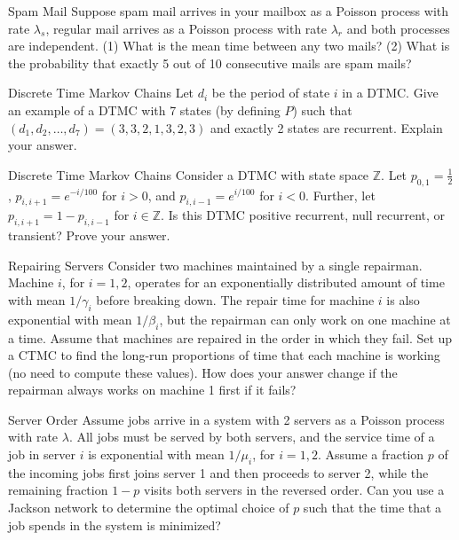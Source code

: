 \begin{problem}{Spam Mail}
 Suppose spam mail arrives in your mailbox as a Poisson process with rate $\lambda_s$, regular mail arrives as a Poisson process with rate $\lambda_r$ and both processes are independent. (1) What is the mean time between any two mails? (2) What is the probability that exactly 5 out of 10 consecutive mails are spam mails?
 \end{problem}

\begin{problem}{Discrete Time Markov Chains} 
Let \( d_i \) be the period of state \( i \) in a DTMC. Give an example of a DTMC with 7 states (by defining \( P \)) such that \( (d_1, d_2, \dots, d_7) = (3, 3, 2, 1, 3, 2, 3) \) and exactly 2 states are recurrent. Explain your answer.
\end{problem}

\begin{problem}{Discrete Time Markov Chains}
Consider a DTMC with state space \( \mathbb{Z} \). Let \( p_{0,1} = \frac{1}{2} \), \( p_{i,i+1} = e^{-i/100} \) for \( i > 0 \), and \( p_{i,i-1} = e^{i/100} \) for \( i < 0 \). Further, let \( p_{i,i+1} = 1 - p_{i,i-1} \) for \( i \in \mathbb{Z} \). Is this DTMC positive recurrent, null recurrent, or transient? Prove your answer.
\end{problem}

\begin{problem}{Repairing Servers}
Consider two machines maintained by a single repairman. Machine \( i \), for \( i = 1, 2 \), operates for an exponentially distributed amount of time with mean \( 1/\gamma_i \) before breaking down. The repair time for machine \( i \) is also exponential with mean \( 1/\beta_i \), but the repairman can only work on one machine at a time. Assume that machines are repaired in the order in which they fail. Set up a CTMC to find the long-run proportions of time that each machine is working (no need to compute these values). How does your answer change if the repairman always works on machine 1 first if it fails?
\end{problem}

\begin{problem}{Server Order}
Assume jobs arrive in a system with 2 servers as a Poisson process with rate \( \lambda \). All jobs must be served by both servers, and the service time of a job in server \( i \) is exponential with mean \( 1/\mu_i \), for \( i = 1, 2 \). Assume a fraction \( p \) of the incoming jobs first joins server 1 and then proceeds to server 2, while the remaining fraction \( 1 - p \) visits both servers in the reversed order. Can you use a Jackson network to determine the optimal choice of \( p \) such that the time that a job spends in the system is minimized?
\end{problem}

